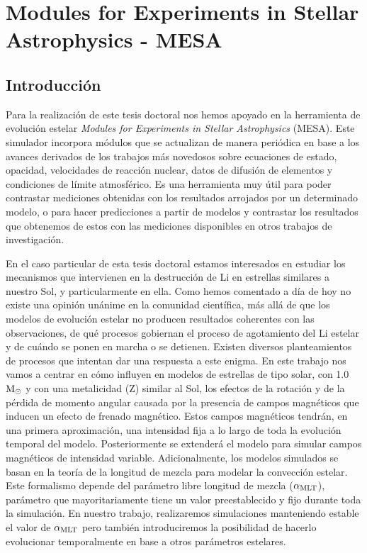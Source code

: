 \chapter{Modules for Experiments in Stellar Astrophysics - MESA}\label{ch:cuarto-capitulo}
\section{Introducción}
Para la realización de este tesis doctoral nos hemos apoyado en la herramienta de evolución estelar \textit{Modules for Experiments in Stellar Astrophysics} (MESA). Este simulador incorpora módulos que se actualizan de manera periódica en base a los avances derivados de los trabajos más novedosos sobre ecuaciones de estado, opacidad, velocidades de reacción nuclear, datos de difusión de elementos y condiciones de límite atmosférico. Es una herramienta muy útil para poder contrastar mediciones obtenidas con los resultados arrojados por un determinado modelo, o para hacer predicciones a partir de modelos y contrastar los resultados que obtenemos de estos con las mediciones disponibles en otros trabajos de investigación.\par

En el caso particular de esta tesis doctoral estamos interesados en estudiar los mecanismos que intervienen en la destrucción de Li en estrellas similares a nuestro Sol, y particularmente en ella. Como hemos comentado a día de hoy no existe una opinión unánime en la comunidad científica, más allá de que los modelos de evolución estelar no producen resultados coherentes con las observaciones, de qué procesos gobiernan el proceso de agotamiento del Li estelar y de cuándo se ponen en marcha o se detienen. Existen diversos planteamientos de procesos que intentan dar una respuesta a este enigma. En este trabajo nos vamos a centrar en cómo influyen en modelos de estrellas de tipo solar, con 1.0 $\mathrm{M}_\odot$ y con una metalicidad (Z) similar al Sol, los efectos de la rotación y de la pérdida de momento angular causada por la presencia de campos magnéticos que inducen un efecto de frenado magnético. Estos campos magnéticos tendrán, en una primera aproximación, una intensidad fija a lo largo de toda la evolución temporal del modelo. Posteriormente se extenderá el modelo para simular campos magnéticos de intensidad variable. Adicionalmente, los modelos simulados se basan en la teoría de la longitud de mezcla para modelar la convección estelar. Este formalismo depende del parámetro libre longitud de mezcla ($\alpha_{\mathrm{MLT}}$), parámetro que mayoritariamente tiene un valor preestablecido y fijo durante toda la simulación. En nuestro trabajo, realizaremos simulaciones manteniendo estable el valor de $\alpha_{\mathrm{MLT}}$ pero también introduciremos la posibilidad de hacerlo evolucionar temporalmente en base a otros parámetros estelares.\par

